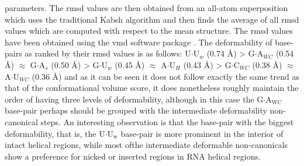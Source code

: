 parameters.   The  rmsd values  are  then  obtained  from an  all-atom
superposition  which uses  the  traditional Kabsh  algorithm and  then
finds the average  of all rmsd values which  are computed with respect
to the  mean structure. The rmsd  values have been  obtained using the
vmd   software  package   \cite{eargle2006}.   The   deformability  of
base-pairs as ranked by their rmsd values is as follows:
U$\cdot$U$_{w}$  (0.74 \AA)  > G$\cdot$A$_{WC}$  (0.54  \AA) $\approx$
G$\cdot$A$_{s}$  (0.50  \AA) >  G$\cdot$U$_{w}$  (0.45 \AA)  $\approx$
A$\cdot$U$_{H}$  (0.43 \AA)  > G$\cdot$C$_{WC}$  (0.38  \AA) $\approx$
A$\cdot$U$_{WC}$ (0.36 \AA)  and as it can be seen  it does not follow
exactly the same trend as  that of the conformational volume score, it
does nonetheless roughly maintain the  order of having three levels of
deformability,  although  in   this  case  the  G$\cdot$A$_{\text{WC}}$
base-pair   perhaps   should   be   grouped  with   the   intermediate
deformability non-canonical steps.  An interesting observation is that
the   base-pair  with   the  biggest   deformability,  that   is,  the
U$\cdot$U$_{\text{w}}$ base-pair is more  prominent in the interior of
intact helical regions, while most ofthe intermediate deformable
non-canonicals show a preference for nicked or inserted regions in RNA
helical regions.

